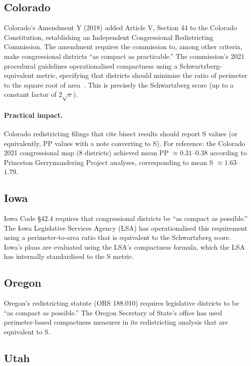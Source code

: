 \subsection{Colorado}

Colorado's Amendment Y (2018) added Article V, Section 44 to the Colorado
Constitution, establishing an Independent Congressional Redistricting Commission.
The amendment requires the commission to, among other criteria, make congressional
districts ``as compact as practicable.''
The commission's 2021 procedural guidelines operationalised compactness using
a Schwartzberg-equivalent metric, specifying that districts should minimise
the ratio of perimeter to the square root of area~\citep{co_irc2021}.
This is precisely the Schwartzberg score (up to a constant factor of $2\sqrt{\pi}$).

\paragraph{Practical impact.}
Colorado redistricting filings that cite bisect results should report S values
(or equivalently, PP values with a note converting to S).
For reference: the Colorado 2021 congressional map (8 districts) achieved
mean PP $\approx 0.31$--$0.38$ according to Princeton Gerrymandering Project analyses,
corresponding to mean S $\approx 1.63$--$1.79$.

\subsection{Iowa}

Iowa Code \S 42.4 requires that congressional districts be ``as compact as possible.''
The Iowa Legislative Services Agency (LSA) has operationalised this requirement
using a perimeter-to-area ratio that is equivalent to the Schwartzberg score.
Iowa's plans are evaluated using the LSA's compactness formula, which the LSA
has internally standardised to the S metric.

\subsection{Oregon}

Oregon's redistricting statute (ORS 188.010) requires legislative districts to
be ``as compact as possible.''
The Oregon Secretary of State's office has used perimeter-based compactness
measures in its redistricting analysis that are equivalent to S.

\subsection{Utah}

